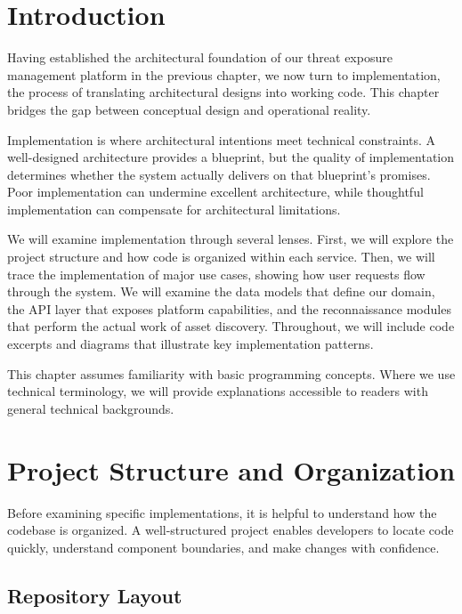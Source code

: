 \documentclass[a4paper,12pt]{report}
\begin{document}
\section*{Introduction}
Having established the architectural foundation of our threat exposure management platform in the previous chapter, we now turn to implementation, the process of translating architectural designs into working code. This chapter bridges the gap between conceptual design and operational reality.\hfill \break

Implementation is where architectural intentions meet technical constraints. A well-designed architecture provides a blueprint, but the quality of implementation determines whether the system actually delivers on that blueprint's promises. Poor implementation can undermine excellent architecture, while thoughtful implementation can compensate for architectural limitations.\hfill \break

We will examine implementation through several lenses. First, we will explore the project structure and how code is organized within each service. Then, we will trace the implementation of major use cases, showing how user requests flow through the system. We will examine the data models that define our domain, the API layer that exposes platform capabilities, and the reconnaissance modules that perform the actual work of asset discovery. Throughout, we will include code excerpts and diagrams that illustrate key implementation patterns.\cite{plantuml_docs}\hfill \break

This chapter assumes familiarity with basic programming concepts. Where we use technical terminology, we will provide explanations accessible to readers with general technical backgrounds.

\section{Project Structure and Organization}

Before examining specific implementations, it is helpful to understand how the codebase is organized. A well-structured project enables developers to locate code quickly, understand component boundaries, and make changes with confidence.

\subsection{Repository Layout}
\end{document}
